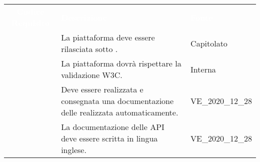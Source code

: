 \renewcommand{\arraystretch}{1.5}


\begin{longtable}{c C{9.5cm} C{2.5cm}} 
	
	\textcolor{white}{\textbf{Codice Requisito}}&
	\textcolor{white}{\textbf{Descrizione}}&
	\textcolor{white}{\textbf{Fonte}}\\

	 & La piattaforma deve essere rilasciata sotto . & Capitolato  \\

	 & La piattaforma dovrà rispettare la validazione W3C. & Interna \\
	
	 & Deve essere realizzata e consegnata una documentazione delle  realizzata automaticamente. & VE\_2020\_12\_28 \\
	
	 & La documentazione delle API deve essere scritta in lingua inglese. & VE\_2020\_12\_28 \\
	
\end{longtable}
